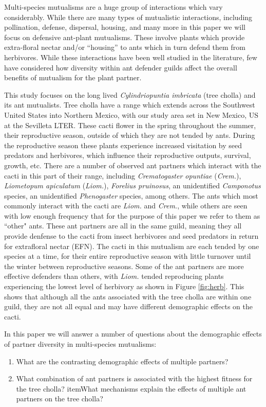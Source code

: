 \documentclass[12pt,a4paper]{article}
\begin{document}
Multi-species mutualisms are a huge group of interactions which vary considerably. 
While there are many types of mutualistic interactions, including pollination, defense, dispersal, housing, and many more\cite{Bronstein2006} in this paper we will focus on defensive ant-plant mutualisms.
These involve plants which provide extra-floral nectar and/or ``housing'' to ants which in turn defend them from herbivores\cite{Bronstein1998}. 
While these interactions have been well studied\cite{} in the literature, few have considered how diversity within ant defender guilds affect the overall benefits of mutualism for the plant partner. 

This study focuses on the long lived \textit{Cylindriopuntia imbricata} (tree cholla) and its ant mutualists. 
Tree cholla have a range which extends across the Southwest United States into Northern Mexico, with our study area set in New Mexico, US at the Sevilleta LTER.
These cacti flower in the spring throughout the summer, their reproductive season, outside of which they are not tended by ants. 
During the reproductive season these plants experience increased visitation by seed predators and herbivores, which influence their reproductive outputs, survival, growth, etc.
There are a number of observed ant partners which interact with the cacti in this part of their range, including \textit{Crematogaster opuntiae} (\textit{Crem.}), \textit{Liometopum apiculatum} (\textit{Liom.}), \textit{Forelius pruinosus}, an unidentified \textit{Camponotus} species, an unidentified \textit{Phenogaster} species, among others. 
The ants which most commonly interact with the cacti are \textit{Liom.} and \textit{Crem.}, while others are seen with low enough frequency that for the purpose of this paper we refer to them as ``other" ants. 
These ant partners are all in the same guild, meaning they all provide denfense to the cacti from insect herbivores and seed predators in return for extrafloral nectar (EFN).
The cacti in this mutualism are each tended by one species at a time, for their entire reproductive season with little turnover until the winter between reproductive seasons. 
Some of the ant partners are more effective defenders than others, with \textit{Liom.} tended reproducing plants experiencing the lowest level of herbivory as shown in Figure \ref{fig:herb}.
This shows that although all the ants associated with the tree cholla are within one guild, they are not all equal and may have different demographic effects on the cacti.

In this paper we will answer a number of questions about the demographic effects of partner diversity in multi-species mutualisms:
\begin{enumerate}
  \item{What are the contrasting demographic effects of multiple partners?}
  \item{What combination of ant partners is associated with the highest fitness for the tree cholla?}
  item{What mechanisms explain the effects of multiple ant partners on the tree cholla?}
\end{enumerate}
\end{document}
